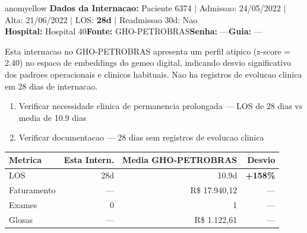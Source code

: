 \documentclass[a4paper,10pt]{article}
\begin{document}
\newpage

\begin{anomalycard}[Internacao 6200 | GHO-PETROBRAS | MODERADO (z=2.40)]{anomyellow}
\textbf{Dados da Internacao:} Paciente 6374 $\mid$ Admissao: 24/05/2022 $\mid$ Alta: 21/06/2022 $\mid$ LOS: \textbf{28d} $\mid$ Readmissao 30d: Nao\\
\textbf{Hospital:} Hospital 40\quad\textbf{Fonte:} GHO-PETROBRAS\quad\textbf{Senha:} ---\quad\textbf{Guia:} ---\\
\vspace{2pt}\begin{tcolorbox}[colback=severityred!20,colframe=anomyellow,title={\textbf{Interpretacao de Negocio}},fonttitle=\bfseries\small,left=4pt,right=4pt,top=3pt,bottom=3pt]
{\small Esta internacao no GHO-PETROBRAS apresenta um perfil atipico (z-score = 2.40) no espaco de embeddings do gemeo digital, indicando desvio significativo dos padroes operacionais e clinicos habituais. Nao ha registros de evolucao clinica em 28 dias de internacao.}
\end{tcolorbox}
\begin{tcolorbox}[colback=severityyellow!30,colframe=anomorange,title={\textbf{Recomendacoes Especificas}},fonttitle=\bfseries\small,left=4pt,right=4pt,top=3pt,bottom=3pt]
\begin{enumerate}[nosep,leftmargin=16pt]
\item {\small Verificar necessidade clinica de permanencia prolongada --- LOS de 28 dias vs media de 10.9 dias}
\item {\small Verificar documentacao --- 28 dias sem registros de evolucao clinica}
\end{enumerate}
\end{tcolorbox}
\begin{center}\begin{tabular}{l r r r}\toprule\textbf{Metrica} & \textbf{Esta Intern.} & \textbf{Media GHO-PETROBRAS} & \textbf{Desvio} \\\midrule
LOS & 28d & 10.9d & \textcolor{anomred}{\textbf{+158\%}} \\
Faturamento & --- & R\$ 17.940,12 & --- \\
Exames & 0 & 1 & --- \\
Glosas & --- & R\$ 1.122,61 & --- \\
\bottomrule\end{tabular}\end{center}


\end{anomalycard}
\end{document}
